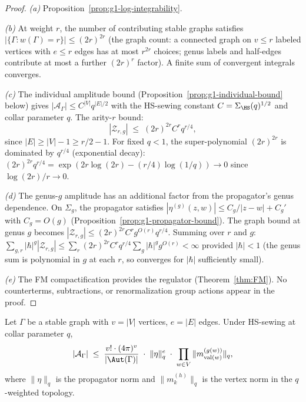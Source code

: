 \begin{proof}
\emph{(a)} Proposition~\ref{prop:g1-log-integrability}.

\emph{(b)} At weight $r$, the number of contributing stable
graphs satisfies $|\{\Gamma : w(\Gamma) = r\}| \leq (2r)^{2r}$
(the graph count: a connected graph on $v \leq r$ labeled
vertices with $e \leq r$ edges has at most $r^{2r}$ choices;
genus labels and half-edges contribute at most a further
$(2r)^r$ factor).  A finite sum of convergent integrals converges.

\emph{(c)} The individual amplitude bound
(Proposition~\ref{prop:g1-individual-bound} below) gives
$|\mathcal{A}_\Gamma| \leq C^{|V|} q^{|E|/2}$ with the HS-sewing
constant $C = \Sigma_{\HS}(q)^{1/2}$ and collar parameter $q$.
The arity-$r$ bound:
\begin{equation}\label{eq:g1-arity-bound}
|\mathcal{Z}_{r,g}|
\;\leq\;
(2r)^{2r} C^r q^{r/4},
\end{equation}
since $|E| \geq |V| - 1 \geq r/2 - 1$.  For fixed $q < 1$,
the super-polynomial $(2r)^{2r}$ is dominated by $q^{r/4}$
(exponential decay): $(2r)^{2r} q^{r/4} = \exp(2r\log(2r) -
(r/4)\log(1/q)) \to 0$ since $\log(2r)/r \to 0$.

\emph{(d)} The genus-$g$ amplitude has an additional factor from
the propagator's genus dependence.  On $\Sigma_g$, the
propagator satisfies $|\eta^{(g)}(z,w)| \leq C_g/|z-w| + C_g'$
with $C_g = O(g)$ (Proposition~\ref{prop:g1-propagator-bound}).
The graph bound at genus $g$ becomes
$|\mathcal{Z}_{r,g}| \leq (2r)^{2r} C^r g^{O(r)} q^{r/4}$.
Summing over $r$ and $g$:
$\sum_{g,r} |\hbar|^g |\mathcal{Z}_{r,g}| \leq
\sum_r (2r)^{2r} C^r q^{r/4}
\sum_g |\hbar|^g g^{O(r)} < \infty$
provided $|\hbar| < 1$ (the genus sum is polynomial in $g$ at
each $r$, so converges for $|\hbar|$ sufficiently small).

\emph{(e)} The FM compactification provides the regulator
(Theorem~\ref{thm:FM}).  No counterterms, subtractions, or
renormalization group actions appear in the proof.
\end{proof}

\begin{proposition}%
\label{prop:g1-individual-bound}%
%
Let $\Gamma$ be a stable graph with $v = |V|$ vertices,
$e = |E|$ edges.  Under HS-sewing at collar parameter $q$,
\begin{equation}\label{eq:g1-individual-bound}
|\mathcal{A}_\Gamma|
\;\leq\;
\frac{v! \cdot (4\pi)^v}{|\Aut(\Gamma)|}
\;\cdot\;
\|\eta\|_q^e
\;\cdot\;
\prod_{w \in V} \|m_{\operatorname{val}(w)}^{(g(w))}\|_q,
\end{equation}
where $\|\eta\|_q$ is the propagator norm and
$\|m_k^{(h)}\|_q$ is the vertex norm in the $q$-weighted
topology.
\end{proposition}

